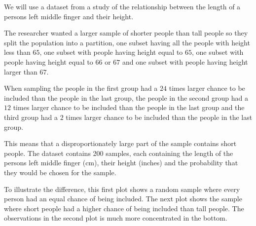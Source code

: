\documentclass{article}
\begin{document}
\begin{example}

We will use a dataset from a study of the relationship between the length of a persons left middle finger and their height. 

The researcher wanted a larger sample of shorter people than tall people so they
split the population into a partition, one subset having all the people with
height less than \(65\), one subset with people having height equal to \(65\), one subset
with people having height equal to \(66\) or \(67\) and one subset with people
having height larger than \(67\).

When sampling the people in the first group had a \(24\) times larger chance to
be included than the people in the last group, the people in the second group
had a \(12\) times larger chance to be included than the people in the last
group and the third group had a \(2\) times larger chance to be included than
the people in the last group.


This means that a disproportionately large part of the sample contains short people. 
The dataset contains 200 samples, each containing the length of the persons left middle finger (cm), their height (inches) and the probability that they would be chosen for the sample.

To illustrate the difference, this first plot shows a random sample where every
person had an equal chance of being included. The next plot shows the sample
where short people had a higher chance of being included than tall people. The
observations in the second plot is much more concentrated in the bottom.


\end{example}
\end{document}
